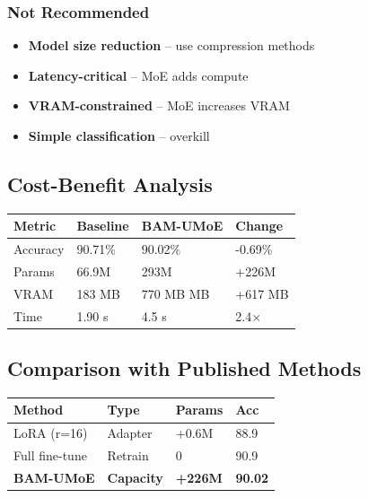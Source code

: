 \subsubsection{Not Recommended}
\begin{itemize}
\item \textbf{Model size reduction} -- use compression methods
\item \textbf{Latency-critical} -- MoE adds compute
\item \textbf{VRAM-constrained} -- MoE increases VRAM
\item \textbf{Simple classification} -- overkill

\end{itemize}
\subsection{Cost-Benefit Analysis}

\begin{table}[H]
\centering
\small
\begin{tabular}{llll}
\toprule
\textbf{Metric} & \textbf{Baseline} & \textbf{BAM-UMoE} & \textbf{Change} \\
\midrule
Accuracy & 90.71\% & 90.02\% & -0.69\% \\
Params & 66.9M & 293M & +226M \\
VRAM & 183 MB & 770 MB MB & +617 MB \\
Time & 1.90 s & 4.5 s & 2.4$\times$ \\
\bottomrule
\end{tabular}
\end{table}

\subsection{Comparison with Published Methods}

\begin{table}[H]
\centering
\small
\begin{tabular}{llll}
\toprule
\textbf{Method} & \textbf{Type} & \textbf{Params} & \textbf{Acc} \\
\midrule
LoRA (r=16) & Adapter & +0.6M & 88.9 \\
Full fine-tune & Retrain & 0 & 90.9 \\
\textbf{BAM-UMoE} & \textbf{Capacity} & \textbf{+226M} & \textbf{90.02} \\
\bottomrule
\end{tabular}
\end{table}

